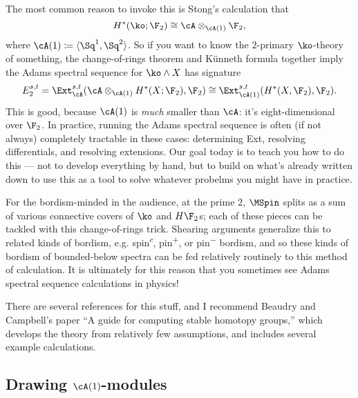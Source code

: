 The most common reason to invoke this is Stong's calculation that
\begin{equation}
	H^*(\ko;\F_2) \cong \cA\otimes_{\cA(1)} \F_2,
\end{equation}
where $\cA(1) \coloneqq \ang{\Sq^1, \Sq^2}$. So if you want to know the $2$-primary $\ko$-theory of something, the
change-of-rings theorem and Künneth formula together imply the Adams spectral sequence for $\ko\wedge X$ has
signature
\begin{equation}
	E_2^{s,t} = \Ext_\cA^{s,t}(\cA\otimes_{\cA(1)} H^*(X;\F_2), \F_2) \cong \Ext_{\cA(1)}^{s,t}(H^*(X,\F_2), \F_2).
\end{equation}
This is good, because $\cA(1)$ is \emph{much} smaller than $\cA$: it's eight-dimensional over $\F_2$. In practice,
running the Adams spectral sequence is often (if not always) completely tractable in these cases: determining Ext,
resolving differentials, and resolving extensions. Our goal today is to teach you how to do this --- not to
develop everything by hand, but to build on what's already written down to use this as a tool to solve whatever
probelms you might have in practice.
\begin{rem}
For the bordism-minded in the audience, at the prime $2$, $\MSpin$ splits as a sum of various connective covers of
$\ko$ and $H\F_2$s; each of these pieces can be tackled with this change-of-rings trick. Shearing arguments
generalize this to related kinds of bordism, e.g. spin\textsuperscript{$c$}, pin\textsuperscript{$+$}, or
pin\textsuperscript{$-$} bordism, and so these kinds of bordism of bounded-below spectra can be fed relatively
routinely to this method of calculation. It is ultimately for this reason that you sometimes see Adams spectral
sequence calculations in physics!
\end{rem}
There are several references for this stuff, and I recommend Beaudry and Campbell's paper ``A guide for computing
stable homotopy groups,'' which develops the theory from relatively few assumptions, and includes several example
calculations.

\subsection{Drawing $\cA(1)$-modules}



